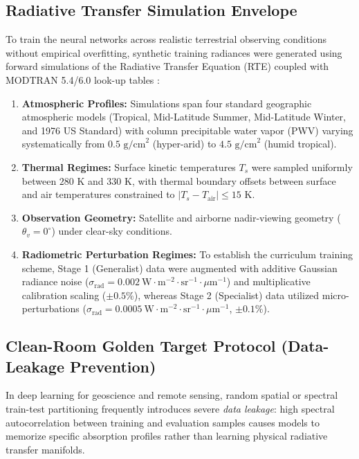 \documentclass[journal]{IEEEtran}
\begin{document}
\subsection{Radiative Transfer Simulation Envelope}
To train the neural networks across realistic terrestrial observing conditions without empirical overfitting, synthetic training radiances were generated using forward simulations of the Radiative Transfer Equation (RTE) coupled with MODTRAN 5.4/6.0 look-up tables \cite{berk2014modtran6, hulley2015mod21}:
\begin{enumerate}
    \item \textbf{Atmospheric Profiles:} Simulations span four standard geographic atmospheric models (Tropical, Mid-Latitude Summer, Mid-Latitude Winter, and 1976 US Standard) with column precipitable water vapor (PWV) varying systematically from $0.5\text{ g/cm}^2$ (hyper-arid) to $4.5\text{ g/cm}^2$ (humid tropical).
    \item \textbf{Thermal Regimes:} Surface kinetic temperatures $T_s$ were sampled uniformly between $280\text{ K}$ and $330\text{ K}$, with thermal boundary offsets between surface and air temperatures constrained to $|T_s - T_{\text{air}}| \le 15\text{ K}$.
    \item \textbf{Observation Geometry:} Satellite and airborne nadir-viewing geometry ($\theta_v = 0^\circ$) under clear-sky conditions.
    \item \textbf{Radiometric Perturbation Regimes:} To establish the curriculum training scheme, Stage 1 (Generalist) data were augmented with additive Gaussian radiance noise ($\sigma_{\text{rad}} = 0.002\ \text{W}\cdot\text{m}^{-2}\cdot\text{sr}^{-1}\cdot\mu\text{m}^{-1}$) and multiplicative calibration scaling ($\pm 0.5\%$), whereas Stage 2 (Specialist) data utilized micro-perturbations ($\sigma_{\text{rad}} = 0.0005\ \text{W}\cdot\text{m}^{-2}\cdot\text{sr}^{-1}\cdot\mu\text{m}^{-1}$, $\pm 0.1\%$).
\end{enumerate}

\subsection{Clean-Room Golden Target Protocol (Data-Leakage Prevention)}
In deep learning for geoscience and remote sensing, random spatial or spectral train-test partitioning frequently introduces severe \textit{data leakage}: high spectral autocorrelation between training and evaluation samples causes models to memorize specific absorption profiles rather than learning physical radiative transfer manifolds.
\end{document}
